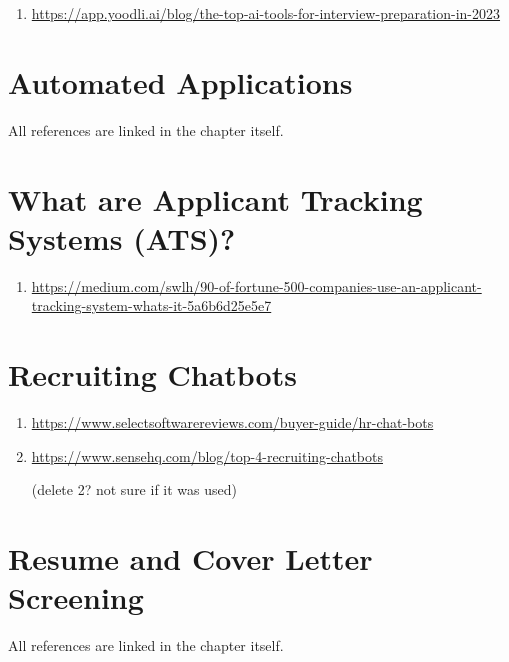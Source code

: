 \documentclass[
]{book}
\providecommand{\tightlist}{%
  \setlength{\itemsep}{0pt}\setlength{\parskip}{0pt}}
\begin{document}
\begin{enumerate}
\def\labelenumi{\arabic{enumi}.}
\tightlist
\item
  \url{https://app.yoodli.ai/blog/the-top-ai-tools-for-interview-preparation-in-2023}
\end{enumerate}

\hypertarget{automated-applications-1}{%
\section{Automated Applications}\label{automated-applications-1}}

All references are linked in the chapter itself.

\hypertarget{what-are-applicant-tracking-systems-ats-1}{%
\section{What are Applicant Tracking Systems (ATS)?}\label{what-are-applicant-tracking-systems-ats-1}}

\begin{enumerate}
\def\labelenumi{\arabic{enumi}.}
\tightlist
\item
  \url{https://medium.com/swlh/90-of-fortune-500-companies-use-an-applicant-tracking-system-whats-it-5a6b6d25e5e7}
\end{enumerate}

\hypertarget{recruiting-chatbots-1}{%
\section{Recruiting Chatbots}\label{recruiting-chatbots-1}}

\begin{enumerate}
\def\labelenumi{\arabic{enumi}.}
\item
  \url{https://www.selectsoftwarereviews.com/buyer-guide/hr-chat-bots}
\item
  \url{https://www.sensehq.com/blog/top-4-recruiting-chatbots}

  (delete 2? not sure if it was used)
\end{enumerate}

\hypertarget{resume-and-cover-letter-screening-1}{%
\section{Resume and Cover Letter Screening}\label{resume-and-cover-letter-screening-1}}

All references are linked in the chapter itself.
\end{document}
